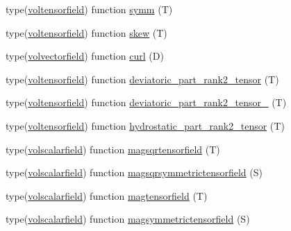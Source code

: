 \begin{DoxyCompactItemize}
\item 
type(\hyperlink{structtensor__fields_1_1voltensorfield}{voltensorfield}) function \hyperlink{classtensor__fields_a99a7a8591ef7c075380d8aec3f9de538}{symm} (T)
\item 
type(\hyperlink{structtensor__fields_1_1voltensorfield}{voltensorfield}) function \hyperlink{classtensor__fields_ab1e0526ce8c32bd6c77a1984a7681c8c}{skew} (T)
\item 
type(\hyperlink{structtensor__fields_1_1volvectorfield}{volvectorfield}) function \hyperlink{classtensor__fields_afef5181a7d5bf8841925c4a50f06374b}{curl} (D)
\item 
type(\hyperlink{structtensor__fields_1_1voltensorfield}{voltensorfield}) function \hyperlink{classtensor__fields_a8ced28c786e906bc2a46c7c5542a71e7}{deviatoric\-\_\-part\-\_\-rank2\-\_\-tensor} (T)
\item 
type(\hyperlink{structtensor__fields_1_1voltensorfield}{voltensorfield}) function \hyperlink{classtensor__fields_afdad221dcd31f2240f916422f7042b9d}{deviatoric\-\_\-part\-\_\-rank2\-\_\-tensor\-\_} (T)
\item 
type(\hyperlink{structtensor__fields_1_1voltensorfield}{voltensorfield}) function \hyperlink{classtensor__fields_adaa0c312edb1949af3dbe083926737b5}{hydrostatic\-\_\-part\-\_\-rank2\-\_\-tensor} (T)
\item 
type(\hyperlink{structtensor__fields_1_1volscalarfield}{volscalarfield}) function \hyperlink{classtensor__fields_ada1cb7ae9d93a4b6bb1357f73c8382b3}{magsqrtensorfield} (T)
\item 
type(\hyperlink{structtensor__fields_1_1volscalarfield}{volscalarfield}) function \hyperlink{classtensor__fields_a160febf9523d975fad84efa927893867}{magsqrsymmetrictensorfield} (S)
\item 
type(\hyperlink{structtensor__fields_1_1volscalarfield}{volscalarfield}) function \hyperlink{classtensor__fields_ad52a00a818947e8c84864d411de35a4d}{magtensorfield} (T)
\item 
type(\hyperlink{structtensor__fields_1_1volscalarfield}{volscalarfield}) function \hyperlink{classtensor__fields_ad669b38b94e143e2c0d140ee89cfb638}{magsymmetrictensorfield} (S)
\end{DoxyCompactItemize}


